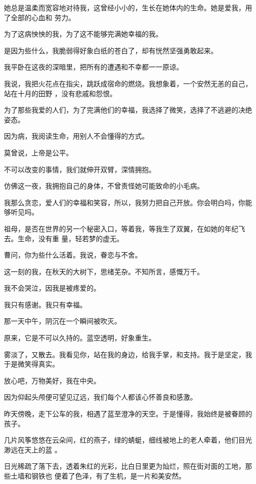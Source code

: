 \documentclass[12pt,a4paper]{article}
\begin{document}
		她总是温柔而宽容地对待我，这曾经小小的，生长在她体内的生命。她是爱我，用了全部的心血和
	劳力。

		为了这病怏怏的我，为了这不能够完满她幸福的我。


		是因为些什么，我脆弱得好象白纸的苍白了，却有恍然坚强勇敢起来。

		我平卧在这夜的深暗里，把所有的遭遇和不幸都一一原谅。


		我说，我把火花点在指尖，跳跃成宿命的燃烧。我想象着，一个安然无恙的自己，站在十月的田野
	，没有悲戚和怨恨。

		为了那些我爱的人们，为了完满他们的幸福，我选择了微笑，选择了不逃避的决绝姿态。


		因为病，我阅读生命，用别人不会懂得的方式。

		莫曾说，上帝是公平。


		不可以改变的事情，我们就伸开双臂，深情拥抱。

		仿佛这一夜，我拥抱自己的身体，不曾责怪她可能致命的小毛病。

		我那么贪恋，爱人们的幸福和笑容，所以，我努力把自己开放。你会明白吗，你能够听见吗。

		祖母，是否在世界的另一个秘密入口，等着我，等我生了双翼，在如她的年纪飞去。生命，没有重
	量，轻若梦的虚无。


		曹问，你为些什么活着。我说，眷恋与不舍。

		这一刻的我，在秋天的大树下，思绪芜杂。不知所言，感慨万千。

		我不会哭泣，因我是被疼爱的。

		我只有感谢。我只有幸福。


		那一天中午，阴沉在一个瞬间被吹灭。

		原来，它是不可以久持的。蓝空透明，好象重生。

		雾淡了，又散去。我看见你，站在我的身边，给我手掌，和支持。我于是坚定，我于是微笑得真实。


		放心吧，万物美好，我在中央。

	\endwriting



		因为仰起头颅便可望见辽远，我们每个人都该心怀善良和感激。


		昨天傍晚，走下公车的我，相遇了蓝至澄净的天空。于是懂得，我始终是被眷顾的孩子。

		几片风筝悠悠在云朵间，红的燕子，绿的蜻蜓，细线被地上的老人牵着，他们目光渺远在天上的蓝
	。

		日光稀疏了落下去，透着朱红的光彩，比白日里更为灿烂，照在街对面的工地，那些土墙和钢铁也
	便着了色泽，有了生机，是一片和美安然。
\end{document}
